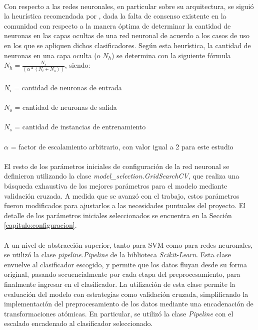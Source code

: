 \paragraph{} Con respecto a las redes neuronales, en particular sobre su arquitectura, se siguió la heurística recomendada por \citet{bib-heuristic-hobs}, dada la falta de consenso existente en la comunidad con respecto a la manera óptima de determinar la cantidad de neuronas en las capas ocultas de una red neuronal de acuerdo a los casos de uso en los que se apliquen dichos clasificadores.
Según esta heurística, la cantidad de neuronas en una capa oculta (o $N_h$) se determina con la siguiente fórmula $N_h = \frac{N_s} {(\alpha * (N_i + N_o))}$, siendo:
\\
\\
$N_i$ = cantidad de neuronas de entrada
\\
\\
$N_o$ = cantidad de neuronas de salida
\\
\\
$N_s$ = cantidad de instancias de entrenamiento
\\
\\
$\alpha$ = factor de escalamiento arbitrario, con valor igual a 2 para este estudio

\paragraph{} El resto de los parámetros iniciales de configuración de la red neuronal se definieron utilizando la clase \textit{model\_selection.GridSearchCV}, que realiza una búsqueda exhaustiva de los mejores parámetros para el modelo mediante validación cruzada.
A medida que se avanzó con el trabajo, estos parámetros fueron modificados para ajustarlos a las necesidades puntuales del proyecto.
El detalle de los parámetros iniciales seleccionados se encuentra en la Sección \ref{capitulo:configuracion}.

\paragraph{} A un nivel de abstracción superior, tanto para SVM como para redes neuronales, se utilizó la clase \textit{pipeline.Pipeline} de la biblioteca \textit{Scikit-Learn}.
Esta clase envuelve al clasificador escogido, y permite que los datos fluyan desde su forma original, pasando secuencialmente por cada etapa del preprocesamiento, para finalmente ingresar en el clasificador.
La utilización de esta clase permite la evaluación del modelo con estrategias como validación cruzada, simplificando la implementación del preprocesamiento de los datos mediante una encadenación de transformaciones atómicas.
En particular, se utilizó la clase \textit{Pipeline} con el escalado encadenado al clasificador seleccionado. 

